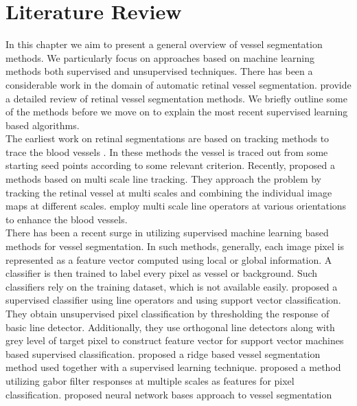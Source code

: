 \section{Literature Review}
In this chapter we aim to present a general overview of vessel segmentation methods. We particularly focus on approaches based on machine learning methods both supervised and unsupervised techniques. There has been a considerable work in the domain of automatic retinal vessel segmentation. \citet{surveyretinal} provide a detailed review of retinal vessel segmentation methods. We briefly outline some of the methods before we move on to explain the most recent supervised learning based algorithms.\\

The earliest work on retinal segmentations are based on tracking methods to trace the blood vessels \cite{trackingchutatape1998retinal, trackingtolias1998fuzzy}. In these methods the vessel is traced out from some starting seed points according to some relevant criterion. Recently, \citet{vlachos2010multi} proposed a methods based on multi scale line tracking. They approach the problem by tracking the retinal vessel at multi scales and combining the individual image maps at different scales. \citet{farnell2008enhancement} employ multi scale line operators at various orientations to enhance the blood vessels.\\

There has been a recent surge in utilizing supervised machine learning based methods for vessel segmentation. In such methods, generally, each image pixel is represented as a feature vector computed using local or global information. A classifier is then trained to label every pixel as vessel or background. Such classifiers rely on the training dataset, which is not available easily. \citet{ricci2007retinal} proposed a supervised classifier using line operators and using support vector classification. They obtain unsupervised pixel classification by thresholding the response of basic line detector. Additionally, they use orthogonal line detectors along with grey level of target pixel to construct feature vector for support vector machines based supervised classification. \citet{staal2004ridge} proposed a ridge based vessel segmentation method used together with a supervised learning technique. \citet{nguyen2011effective} proposed a method utilizing gabor filter responses at multiple scales as features for pixel classification. \cite{vega2013blood, gardner1996automatic} proposed neural network bases approach to vessel segmentation\\

